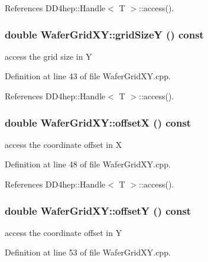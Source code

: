 References DD4hep::Handle$<$ T $>$::access().\hypertarget{class_d_d4hep_1_1_geometry_1_1_wafer_grid_x_y_a38bb2eb8abf6faec5aea2f543b342c11}{
\subsubsection[{gridSizeY}]{\setlength{\rightskip}{0pt plus 5cm}double WaferGridXY::gridSizeY () const}}
\label{class_d_d4hep_1_1_geometry_1_1_wafer_grid_x_y_a38bb2eb8abf6faec5aea2f543b342c11}


access the grid size in Y 

Definition at line 43 of file WaferGridXY.cpp.

References DD4hep::Handle$<$ T $>$::access().\hypertarget{class_d_d4hep_1_1_geometry_1_1_wafer_grid_x_y_acdbedcd3bc0cf0df35ef8280d26af614}{
\subsubsection[{offsetX}]{\setlength{\rightskip}{0pt plus 5cm}double WaferGridXY::offsetX () const}}
\label{class_d_d4hep_1_1_geometry_1_1_wafer_grid_x_y_acdbedcd3bc0cf0df35ef8280d26af614}


access the coordinate offset in X 

Definition at line 48 of file WaferGridXY.cpp.

References DD4hep::Handle$<$ T $>$::access().\hypertarget{class_d_d4hep_1_1_geometry_1_1_wafer_grid_x_y_afc6458e397147d5189a777c5e9450be7}{
\subsubsection[{offsetY}]{\setlength{\rightskip}{0pt plus 5cm}double WaferGridXY::offsetY () const}}
\label{class_d_d4hep_1_1_geometry_1_1_wafer_grid_x_y_afc6458e397147d5189a777c5e9450be7}


access the coordinate offset in Y 

Definition at line 53 of file WaferGridXY.cpp.

